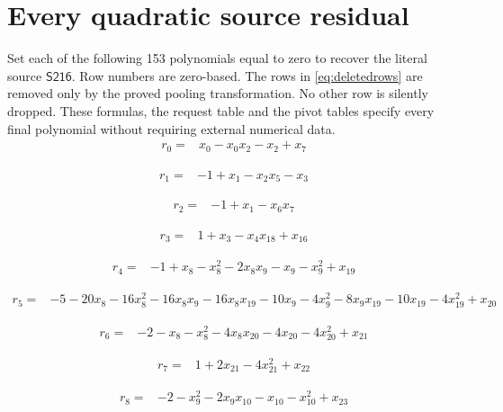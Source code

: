 \documentclass[10pt,letterpaper]{article}
\theoremstyle{remark}\newtheorem{remark}[theorem]{Remark}
\newcommand{\src}{\textsf{S216}}
\begin{document}
\section{Every quadratic source residual}\label{app:rows}
Set each of the following 153 polynomials equal to zero to recover the
literal source $\src$. Row numbers are zero-based. The rows in
\eqref{eq:deletedrows} are removed only by the proved pooling
transformation. No other row is silently dropped. These formulas,
the request table and the pivot tables specify every final polynomial
without requiring external numerical data.
\begingroup\small\allowdisplaybreaks[4]
\begin{align*}
r_{0}={}&x_{0}-x_{0}x_{2}-x_{2}+x_{7}
\end{align*}

\begin{align*}
r_{1}={}&-1+x_{1}-x_{2}x_{5}-x_{3}
\end{align*}

\begin{align*}
r_{2}={}&-1+x_{1}-x_{6}x_{7}
\end{align*}

\begin{align*}
r_{3}={}&1+x_{3}-x_{4}x_{18}+x_{16}
\end{align*}

\begin{align*}
r_{4}={}&-1+x_{8}-x_{8}^{2}-2x_{8}x_{9}-x_{9}-x_{9}^{2}+x_{19}
\end{align*}

\begin{align*}
r_{5}={}&-5-20x_{8}-16x_{8}^{2}-16x_{8}x_{9}-16x_{8}x_{19}-10x_{9}-4x_{9}^{2}-8x_{9}x_{19}-10x_{19}-4x_{19}^{2}+x_{20}
\end{align*}

\begin{align*}
r_{6}={}&-2-x_{8}-x_{8}^{2}-4x_{8}x_{20}-4x_{20}-4x_{20}^{2}+x_{21}
\end{align*}

\begin{align*}
r_{7}={}&1+2x_{21}-4x_{21}^{2}+x_{22}
\end{align*}

\begin{align*}
r_{8}={}&-2-x_{9}^{2}-2x_{9}x_{10}-x_{10}-x_{10}^{2}+x_{23}
\end{align*}
\end{document}
